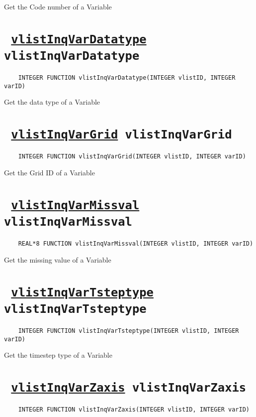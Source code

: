Get the Code number of a Variable
\ifpdfoutput{}{(\ref{vlistInqVarCode})}


\section*{\texttt{ 
\ifpdf
\hyperref[vlistInqVarDatatype]{vlistInqVarDatatype}
\else
vlistInqVarDatatype
\fi
}}
\begin{verbatim}
    INTEGER FUNCTION vlistInqVarDatatype(INTEGER vlistID, INTEGER varID)
\end{verbatim}

Get the data type of a Variable
\ifpdfoutput{}{(\ref{vlistInqVarDatatype})}


\section*{\texttt{ 
\ifpdf
\hyperref[vlistInqVarGrid]{vlistInqVarGrid}
\else
vlistInqVarGrid
\fi
}}
\begin{verbatim}
    INTEGER FUNCTION vlistInqVarGrid(INTEGER vlistID, INTEGER varID)
\end{verbatim}

Get the Grid ID of a Variable
\ifpdfoutput{}{(\ref{vlistInqVarGrid})}


\section*{\texttt{ 
\ifpdf
\hyperref[vlistInqVarMissval]{vlistInqVarMissval}
\else
vlistInqVarMissval
\fi
}}
\begin{verbatim}
    REAL*8 FUNCTION vlistInqVarMissval(INTEGER vlistID, INTEGER varID)
\end{verbatim}

Get the missing value of a Variable
\ifpdfoutput{}{(\ref{vlistInqVarMissval})}


\section*{\texttt{ 
\ifpdf
\hyperref[vlistInqVarTsteptype]{vlistInqVarTsteptype}
\else
vlistInqVarTsteptype
\fi
}}
\begin{verbatim}
    INTEGER FUNCTION vlistInqVarTsteptype(INTEGER vlistID, INTEGER varID)
\end{verbatim}

Get the timestep type of a Variable
\ifpdfoutput{}{(\ref{vlistInqVarTsteptype})}


\section*{\texttt{ 
\ifpdf
\hyperref[vlistInqVarZaxis]{vlistInqVarZaxis}
\else
vlistInqVarZaxis
\fi
}}
\begin{verbatim}
    INTEGER FUNCTION vlistInqVarZaxis(INTEGER vlistID, INTEGER varID)
\end{verbatim}


